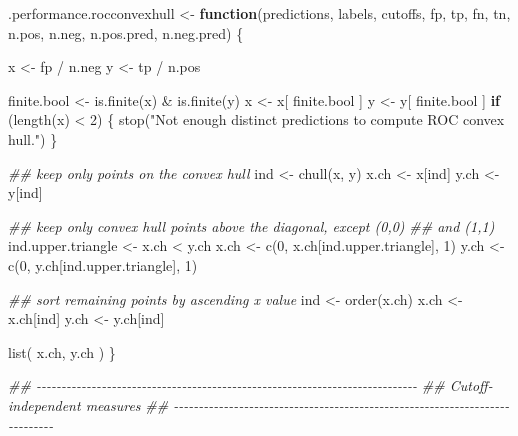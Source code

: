 \documentclass[
  letterpaper,
  DIV=11,
  numbers=noendperiod]{scrartcl}
\newenvironment{Shaded}{\begin{snugshade}}{\end{snugshade}}
\newcommand{\ControlFlowTok}[1]{\textcolor[rgb]{0.00,0.23,0.31}{\textbf{#1}}}
\newcommand{\DecValTok}[1]{\textcolor[rgb]{0.68,0.00,0.00}{#1}}
\newcommand{\DocumentationTok}[1]{\textcolor[rgb]{0.37,0.37,0.37}{\textit{#1}}}
\newcommand{\FunctionTok}[1]{\textcolor[rgb]{0.28,0.35,0.67}{#1}}
\newcommand{\NormalTok}[1]{\textcolor[rgb]{0.00,0.23,0.31}{#1}}
\newcommand{\OtherTok}[1]{\textcolor[rgb]{0.00,0.23,0.31}{#1}}
\newcommand{\SpecialCharTok}[1]{\textcolor[rgb]{0.37,0.37,0.37}{#1}}
\newcommand{\StringTok}[1]{\textcolor[rgb]{0.13,0.47,0.30}{#1}}
\begin{document}
\begin{Shaded}
\begin{Highlighting}[]
\NormalTok{.performance.rocconvexhull }\OtherTok{\textless{}{-}}
  \ControlFlowTok{function}\NormalTok{(predictions, labels, cutoffs, fp, tp, fn, tn,}
\NormalTok{           n.pos, n.neg, n.pos.pred, n.neg.pred) \{}
      
\NormalTok{      x }\OtherTok{\textless{}{-}}\NormalTok{ fp }\SpecialCharTok{/}\NormalTok{ n.neg}
\NormalTok{      y }\OtherTok{\textless{}{-}}\NormalTok{ tp }\SpecialCharTok{/}\NormalTok{ n.pos}

\NormalTok{      finite.bool }\OtherTok{\textless{}{-}} \FunctionTok{is.finite}\NormalTok{(x) }\SpecialCharTok{\&} \FunctionTok{is.finite}\NormalTok{(y)}
\NormalTok{      x }\OtherTok{\textless{}{-}}\NormalTok{ x[ finite.bool ]}
\NormalTok{      y }\OtherTok{\textless{}{-}}\NormalTok{ y[ finite.bool ]}
      \ControlFlowTok{if}\NormalTok{ (}\FunctionTok{length}\NormalTok{(x) }\SpecialCharTok{\textless{}} \DecValTok{2}\NormalTok{) \{}
          \FunctionTok{stop}\NormalTok{(}\StringTok{"Not enough distinct predictions to compute ROC convex hull."}\NormalTok{)}
\NormalTok{      \}}

      \DocumentationTok{\#\# keep only points on the convex hull}
\NormalTok{      ind }\OtherTok{\textless{}{-}} \FunctionTok{chull}\NormalTok{(x, y)}
\NormalTok{      x.ch }\OtherTok{\textless{}{-}}\NormalTok{ x[ind]}
\NormalTok{      y.ch }\OtherTok{\textless{}{-}}\NormalTok{ y[ind]}

      \DocumentationTok{\#\# keep only convex hull points above the diagonal, except (0,0)}
      \DocumentationTok{\#\# and (1,1)}
\NormalTok{      ind.upper.triangle }\OtherTok{\textless{}{-}}\NormalTok{ x.ch }\SpecialCharTok{\textless{}}\NormalTok{ y.ch}
\NormalTok{      x.ch }\OtherTok{\textless{}{-}} \FunctionTok{c}\NormalTok{(}\DecValTok{0}\NormalTok{, x.ch[ind.upper.triangle], }\DecValTok{1}\NormalTok{)}
\NormalTok{      y.ch }\OtherTok{\textless{}{-}} \FunctionTok{c}\NormalTok{(}\DecValTok{0}\NormalTok{, y.ch[ind.upper.triangle], }\DecValTok{1}\NormalTok{)}

      \DocumentationTok{\#\# sort remaining points by ascending x value}
\NormalTok{      ind }\OtherTok{\textless{}{-}} \FunctionTok{order}\NormalTok{(x.ch)}
\NormalTok{      x.ch }\OtherTok{\textless{}{-}}\NormalTok{ x.ch[ind]}
\NormalTok{      y.ch }\OtherTok{\textless{}{-}}\NormalTok{ y.ch[ind]}

      \FunctionTok{list}\NormalTok{( x.ch, y.ch )}
\NormalTok{  \}}

\DocumentationTok{\#\# {-}{-}{-}{-}{-}{-}{-}{-}{-}{-}{-}{-}{-}{-}{-}{-}{-}{-}{-}{-}{-}{-}{-}{-}{-}{-}{-}{-}{-}{-}{-}{-}{-}{-}{-}{-}{-}{-}{-}{-}{-}{-}{-}{-}{-}{-}{-}{-}{-}{-}{-}{-}{-}{-}{-}{-}{-}{-}{-}{-}{-}{-}{-}{-}{-}{-}{-}{-}{-}{-}{-}{-}{-}{-}{-}{-}}
\DocumentationTok{\#\# Cutoff{-}independent measures}
\DocumentationTok{\#\# {-}{-}{-}{-}{-}{-}{-}{-}{-}{-}{-}{-}{-}{-}{-}{-}{-}{-}{-}{-}{-}{-}{-}{-}{-}{-}{-}{-}{-}{-}{-}{-}{-}{-}{-}{-}{-}{-}{-}{-}{-}{-}{-}{-}{-}{-}{-}{-}{-}{-}{-}{-}{-}{-}{-}{-}{-}{-}{-}{-}{-}{-}{-}{-}{-}{-}{-}{-}{-}{-}{-}{-}{-}{-}{-}{-}}


\end{Highlighting}
\end{Shaded}
\end{document}
